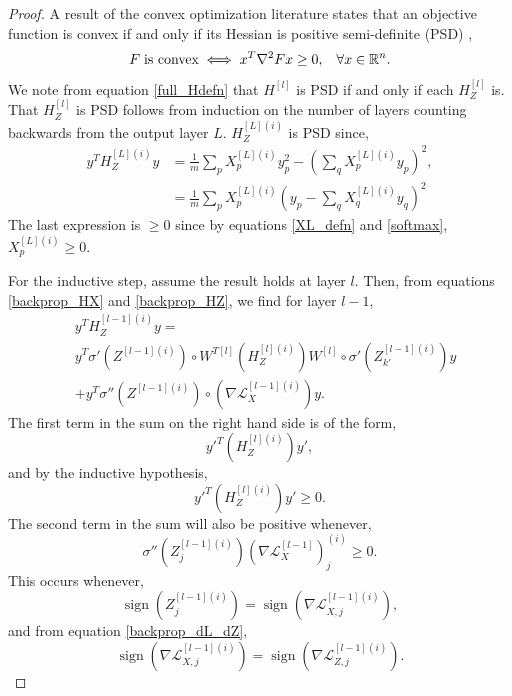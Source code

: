 \documentclass[nohyperref]{article}
\theoremstyle{plain}
\theoremstyle{definition}
\theoremstyle{remark}
\DeclareMathOperator*{\sgn}{sign}
\begin{document}
\begin{proof} 
A result of the convex optimization literature states that an objective function is convex if and only if its Hessian is positive semi-definite (PSD) \citep[see][page 71]{Boyd:Vanden},
\begin{equation}
F \hspace{0.1cm} \textrm{is convex} \iff x^T \nabla^2 F x \ge 0, \hspace{0.3cm} \forall x \in \mathbb{R}^n.
\end{equation} 
We note from equation \ref{full_Hdefn} that $H^{[l]}$ is PSD if and only if each $H_Z^{[l]}$ is. That $H_Z^{[l]}$ is PSD follows from induction on the number of layers counting backwards from the output layer $L$.
$H_{Z}^{[L](i)}$ is PSD since,
\begin{align}
y^T H_{Z}^{[L](i)}y&=\frac{1}{m} \sum_p  X^{[L](i)}_p y_p^2 -(\sum_q X^{[L](i)}_p y_p)^2,\nonumber\\
&=\frac{1}{m} \sum_p X^{[L](i)}_p(y_p-\sum_q X^{[L](i)}_q y_q)^2
\end{align}
The last expression is $\ge 0$ since by equations \ref{XL_defn} and \ref{softmax}, $X^{[L](i)}_p \ge 0$.

For the inductive step, assume the result holds at layer $l$. Then, from equations \ref{backprop_HX} and \ref{backprop_HZ}, we find for layer $l-1$,
\begin{align} 
 &y^T H_{Z}^{[l-1](i)}y=\nonumber\\
 &y^T \sigma'{(Z^{[l-1](i)})}\circ W^{T[l]} (H_Z^{[l](i)})W^{[l]}\circ \sigma'{(Z_{k'}^{[l-1](i)})} y\nonumber\\
 &+y^{T}\sigma''{(Z^{[l-1](i)})}\circ \left(\nabla \mathcal{L}^{[l-1](i)}_{X}\right) y.
 \end{align}
The first term in the sum on the right hand side is of the form,
\begin{equation}
 y'^T  (H_Z^{[l](i)}) y',
 \end{equation}
and by the inductive hypothesis,
\begin{equation}
 y'^T  (H_Z^{[l](i)}) y' \ge 0.
 \end{equation} 
 The second term in the sum will also be positive whenever,
\begin{equation}
\sigma''{(Z_j^{[l-1](i)})} \left(\nabla \mathcal{L}^{[l-1]}_{X}\right)_j^{(i)}\ge 0.
\end{equation}
This occurs whenever,
\begin{equation}
\sgn{\left(Z_j^{[l-1](i)}\right)}= \sgn{\left(\nabla \mathcal{L}^{[l-1](i)}_{X,j} \right)},
\end{equation} 
and from equation \ref{backprop_dL_dZ}, 
\begin{equation}
\sgn{\left(\nabla \mathcal{L}^{[l-1](i)}_{X,j}\right)}= \sgn{\left(\nabla \mathcal{L}^{[l-1](i)}_{Z,j} \right)}.
\end{equation}  
\end{proof}
\end{document}
